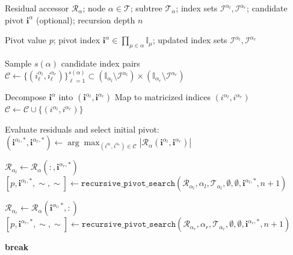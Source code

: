 \documentclass{article}
\theoremstyle{plain}
\theoremstyle{definition}
\theoremstyle{remark}
\begin{document}
\begin{algorithm}[htb]
\caption{\texttt{recursive\_pivot\_search}: Residual-guided pivot search}
\label{alg:recursive_pivot_search}
\begin{algorithmic}[1]

\Require Residual accessor $\mathcal{R}_\alpha$; node $\alpha \in \mathcal{T}$; subtree $\mathcal{T}_\alpha$;
index sets $\mathcal{I}^{\alpha_l}, \mathcal{I}^{\alpha_r}$;
candidate pivot $\bm{i}^\alpha$ (optional); recursion depth $n$

\Ensure Pivot value $p$; pivot index $\bm{i}^\alpha \in \prod_{\mu \in \alpha}\mathbb{I}_\mu$;
updated index sets $\mathcal{I}^{\alpha_l}, \mathcal{I}^{\alpha_r}$

  \State Sample $s(\alpha)$ candidate index pairs
  \State $\mathcal{C} \gets \{(i_\ell^{\alpha_l}, i_\ell^{\alpha_r})\}_{\ell=1}^{s(\alpha)}
          \subset (\mathbb{I}_{\alpha_l}\setminus\mathcal{I}^{\alpha_l})
          \times (\mathbb{I}_{\alpha_r}\setminus\mathcal{I}^{\alpha_r})$

    \State Decompose $\bm{i}^\alpha$ into $(\bm{i}^{\alpha_l}, \bm{i}^{\alpha_r})$
    \State Map to matricized indices $(i^{\alpha_l}, i^{\alpha_r})$
    \State $\mathcal{C} \gets \mathcal{C}\cup\{(i^{\alpha_l}, i^{\alpha_r})\}$
  \EndIf

  \State Evaluate residuals and select initial pivot:
  \State $(\bm{i}^{\alpha_l,*}, \bm{i}^{\alpha_r,*}) \gets
         \arg\max_{(i^{\alpha_l},i^{\alpha_r})\in\mathcal{C}}
         |\mathcal{R}_\alpha(\bm{i}^{\alpha_l}, \bm{i}^{\alpha_r})|$

    \State $\mathcal{R}_{\alpha_l} \gets \mathcal{R}_\alpha(:, \bm{i}^{\alpha_r,*})$
    \State $[p, \bm{i}^{\alpha_l,*}, \sim, \sim] \gets
           \texttt{recursive\_pivot\_search}\left(\mathcal{R}_{\alpha_l}, \alpha_l,
             \mathcal{T}_{\alpha_l}, \emptyset, \emptyset, \bm{i}^{\alpha_l,*}, n+1\right)$

    \State $\mathcal{R}_{\alpha_r} \gets \mathcal{R}_\alpha(\bm{i}^{\alpha_l,*}, :)$
    \State $[p, \bm{i}^{\alpha_r,*}, \sim, \sim] \gets
           \texttt{recursive\_pivot\_search}\left(\mathcal{R}_{\alpha_r}, \alpha_r,
             \mathcal{T}_{\alpha_r}, \emptyset, \emptyset, \bm{i}^{\alpha_r,*}, n+1\right)$

      \State \textbf{break} 
    \EndIf
  \EndFor


\end{algorithmic}
\end{algorithm}
\end{document}
